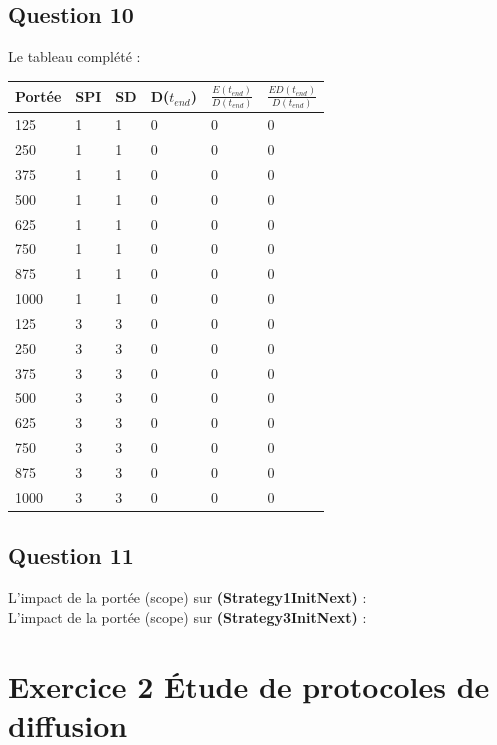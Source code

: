 \documentclass[10pt]{report}
\begin{document}
\subsection{Question 10}
Le tableau complété :\\

\begin{center}
\begin{tabular}{|l|l|l|l|l|l|}
  \hline
  Portée & SPI & SD & D($t_{end}$) & $\frac{E(t_{end})}{D(t_{end})}$ & $\frac{ED(t_{end})}{D(t_{end})}$\\
  \hline
	125 & 1 & 1 & 0 & 0 & 0\\
  \hline
	250 & 1 & 1 & 0 & 0 & 0\\
  \hline
	375 & 1 & 1 & 0 & 0 & 0\\
  \hline
	500 & 1 & 1 & 0 & 0 & 0\\
  \hline
	625 & 1 & 1 & 0 & 0 & 0\\
  \hline
	750 & 1 & 1 & 0 & 0 & 0\\
  \hline
	875 & 1 & 1 & 0 & 0 & 0\\
  \hline
	1000 & 1 & 1 & 0 & 0 & 0\\
  \hline
	125 & 3 & 3 & 0 & 0 & 0\\
  \hline
	250 & 3 & 3 & 0 & 0 & 0\\
  \hline
	375 & 3 & 3 & 0 & 0 & 0\\
  \hline
	500 & 3 & 3 & 0 & 0 & 0\\
  \hline
	625 & 3 & 3 & 0 & 0 & 0\\
  \hline
	750 & 3 & 3 & 0 & 0 & 0\\
  \hline
	875 & 3 & 3 & 0 & 0 & 0\\
  \hline
	1000 & 3 & 3 & 0 & 0 & 0\\
  \hline
\end{tabular}
\end{center}

\subsection{Question 11}

L'impact de la portée (scope) sur \textbf{(Strategy1InitNext)} :\\

L'impact de la portée (scope) sur \textbf{(Strategy3InitNext)} :\\

\newpage
\section{Exercice 2  Étude de protocoles de diffusion}
\end{document}
